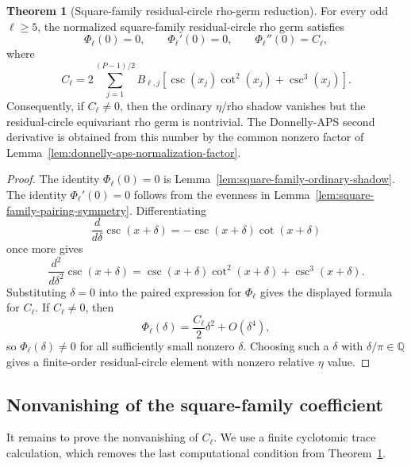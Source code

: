 \documentclass{article}
\theoremstyle{definition}
\newtheorem{theorem}{Theorem}[section]
\numberwithin{equation}{section}
\begin{document}
\begin{theorem}[Square-family residual-circle rho-germ reduction]
\label{thm:square-family-rho-germ-reduction}
For every odd $\ell\geq 5$, the normalized square-family residual-circle rho germ satisfies
\begin{equation}
\Phi_\ell(0)=0,
\qquad
\Phi_\ell'(0)=0,
\qquad
\Phi_\ell''(0)=C_\ell,
\end{equation}
where
\begin{equation}
C_\ell=2\sum_{j=1}^{(P-1)/2}B_{\ell,j}\left[\csc(x_j)\cot^2(x_j)+\csc^3(x_j)\right].
\end{equation}
Consequently, if $C_\ell\neq 0$, then the ordinary $\eta$/rho shadow vanishes but the residual-circle equivariant rho germ is nontrivial.  The Donnelly-APS second derivative is obtained from this number by the common nonzero factor of Lemma~\ref{lem:donnelly-aps-normalization-factor}.
\end{theorem}

\begin{proof}
The identity $\Phi_\ell(0)=0$ is Lemma~\ref{lem:square-family-ordinary-shadow}.  The identity $\Phi_\ell'(0)=0$ follows from the evenness in Lemma~\ref{lem:square-family-pairing-symmetry}.  Differentiating
\begin{equation}
\frac{d}{d\delta}\csc(x+\delta)=-\csc(x+\delta)\cot(x+\delta)
\end{equation}
once more gives
\begin{equation}
\frac{d^2}{d\delta^2}\csc(x+\delta)=\csc(x+\delta)\cot^2(x+\delta)+\csc^3(x+\delta).
\end{equation}
Substituting $\delta=0$ into the paired expression for $\Phi_\ell$ gives the displayed formula for $C_\ell$.  If $C_\ell\neq 0$, then
\begin{equation}
\Phi_\ell(\delta)=\frac{C_\ell}{2}\delta^2+O(\delta^4),
\end{equation}
so $\Phi_\ell(\delta)\neq 0$ for all sufficiently small nonzero $\delta$.  Choosing such a $\delta$ with $\delta/\pi\in\mathbb Q$ gives a finite-order residual-circle element with nonzero relative $\eta$ value.
\end{proof}

\subsection{Nonvanishing of the square-family coefficient}
\label{subsec:stage5B3-square-family-coefficient}

It remains to prove the nonvanishing of $C_\ell$.  We use a finite cyclotomic trace calculation, which removes the last computational condition from Theorem~\ref{thm:square-family-rho-germ-reduction}.
\end{document}
